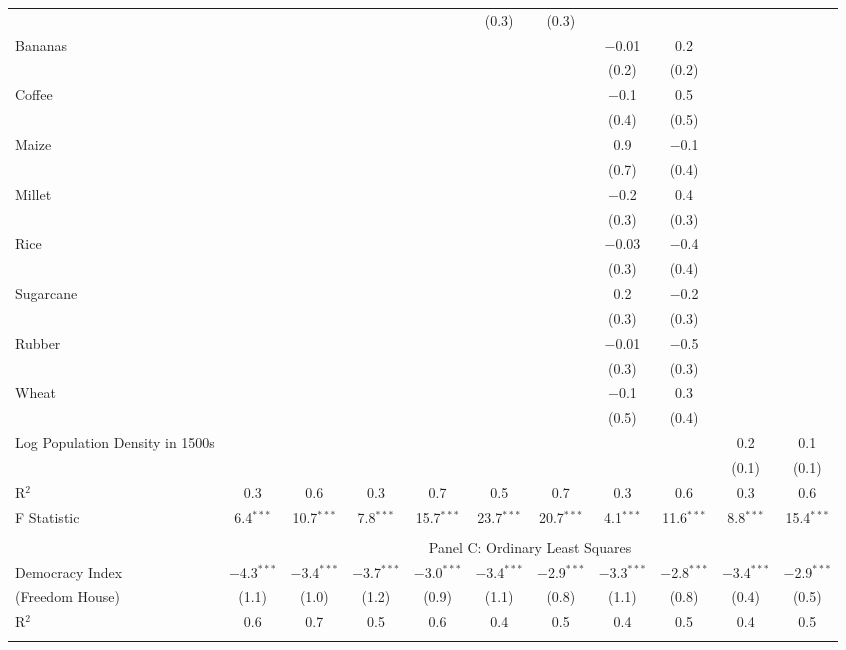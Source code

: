 \begin{table}[!htbp]
\begin{threeparttable}
\begin{tabular}{@{\extracolsep{0pt}}lcccccccccc}
  &  &  &  &  & (0.3) & (0.3) &  &  &  &  \\ 
  Bananas &  &  &  &  &  &  & $-$0.01 & 0.2 &  &  \\ 
  &  &  &  &  &  &  & (0.2) & (0.2) &  &  \\ 
  Coffee &  &  &  &  &  &  & $-$0.1 & 0.5 &  &  \\ 
  &  &  &  &  &  &  & (0.4) & (0.5) &  &  \\ 
  Maize &  &  &  &  &  &  & 0.9 & $-$0.1 &  &  \\ 
  &  &  &  &  &  &  & (0.7) & (0.4) &  &  \\ 
  Millet &  &  &  &  &  &  & $-$0.2 & 0.4 &  &  \\ 
  &  &  &  &  &  &  & (0.3) & (0.3) &  &  \\ 
  Rice &  &  &  &  &  &  & $-$0.03 & $-$0.4 &  &  \\ 
  &  &  &  &  &  &  & (0.3) & (0.4) &  &  \\ 
  Sugarcane &  &  &  &  &  &  & 0.2 & $-$0.2 &  &  \\ 
  &  &  &  &  &  &  & (0.3) & (0.3) &  &  \\ 
  Rubber &  &  &  &  &  &  & $-$0.01 & $-$0.5 &  &  \\ 
  &  &  &  &  &  &  & (0.3) & (0.3) &  &  \\ 
  Wheat &  &  &  &  &  &  & $-$0.1 & 0.3 &  &  \\ 
  &  &  &  &  &  &  & (0.5) & (0.4) &  &  \\ 
  Log Population Density in 1500s &  &  &  &  &  &  &  &  & 0.2 & 0.1 \\ 
  &  &  &  &  &  &  &  &  & (0.1) & (0.1) \\ 
R$^{2}$ & 0.3 & 0.6 & 0.3 & 0.7 & 0.5 & 0.7 & 0.3 & 0.6 & 0.3 & 0.6 \\ 
F Statistic & 6.4$^{***}$ & 10.7$^{***}$ & 7.8$^{***}$ & 15.7$^{***}$ & 23.7$^{***}$ & 20.7$^{***}$ & 4.1$^{***}$ & 11.6$^{***}$ & 8.8$^{***}$ & 15.4$^{***}$ \\ 
 \hline \\[-1.8ex] 
  & \multicolumn{10}{c}{Panel C: Ordinary Least Squares} \\
 Democracy Index & $-$4.3$^{***}$ & $-$3.4$^{***}$ & $-$3.7$^{***}$ & $-$3.0$^{***}$ & $-$3.4$^{***}$ & $-$2.9$^{***}$ & $-$3.3$^{***}$ & $-$2.8$^{***}$ & $-$3.4$^{***}$ & $-$2.9$^{***}$ \\ 
 (Freedom House) & (1.1) & (1.0) & (1.2) & (0.9) & (1.1) & (0.8) & (1.1) & (0.8) & (0.4) & (0.5) \\ 
R$^{2}$ & 0.6 & 0.7 & 0.5 & 0.6 & 0.4 & 0.5 & 0.4 & 0.5 & 0.4 & 0.5 \\ 
  \hline \\[-1.8ex] 


\end{tabular}
\end{threeparttable}
\end{table}
